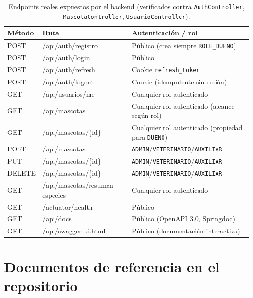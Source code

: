 \begin{table}[H]
  \centering
  \small
  \caption{Endpoints reales expuestos por el backend (verificados contra \texttt{AuthController}, \texttt{MascotaController}, \texttt{UsuarioController}).}
  \label{tab:endpoints-anexo}
  \begin{tabular}{@{}llp{7.5cm}@{}}
    \toprule
    M\'etodo & Ruta & Autenticaci\'on / rol \\
    \midrule
    POST & /api/auth/registro & P\'ublico (crea siempre \texttt{ROLE_DUENO}) \\
    POST & /api/auth/login & P\'ublico \\
    POST & /api/auth/refresh & Cookie \texttt{refresh\_token} \\
    POST & /api/auth/logout & Cookie (idempotente sin sesi\'on) \\
    GET & /api/usuarios/me & Cualquier rol autenticado \\
    GET & /api/mascotas & Cualquier rol autenticado (alcance seg\'un rol) \\
    GET & /api/mascotas/\{id\} & Cualquier rol autenticado (propiedad para \texttt{DUENO}) \\
    POST & /api/mascotas & \texttt{ADMIN}/\texttt{VETERINARIO}/\texttt{AUXILIAR} \\
    PUT & /api/mascotas/\{id\} & \texttt{ADMIN}/\texttt{VETERINARIO}/\texttt{AUXILIAR} \\
    DELETE & /api/mascotas/\{id\} & \texttt{ADMIN}/\texttt{VETERINARIO}/\texttt{AUXILIAR} \\
    GET & /api/mascotas/resumen-especies & Cualquier rol autenticado \\
    GET & /actuator/health & P\'ublico \\
    GET & /api/docs & P\'ublico (OpenAPI 3.0, Springdoc) \\
    GET & /api/swagger-ui.html & P\'ublico (documentaci\'on interactiva) \\
    \bottomrule
  \end{tabular}
\end{table}

\section{Documentos de referencia en el repositorio}


